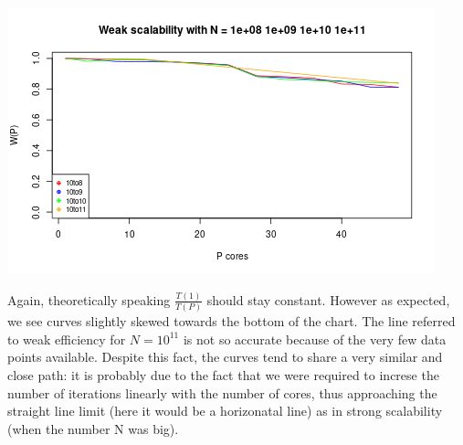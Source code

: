 \documentclass[
  10pt,
]{article}
\begin{document}
\begin{center}\includegraphics{figs/ws_scal-1} \end{center}

Again, theoretically speaking \(\frac{T(1)}{T(P)}\) should stay
constant. However as expected, we see curves slightly skewed towards the
bottom of the chart. The line referred to weak efficiency for
\(N=10^{11}\) is not so accurate because of the very few data points
available. Despite this fact, the curves tend to share a very similar
and close path: it is probably due to the fact that we were required to
increse the number of iterations linearly with the number of cores, thus
approaching the straight line limit (here it would be a horizonatal
line) as in strong scalability (when the number N was big).
\end{document}
